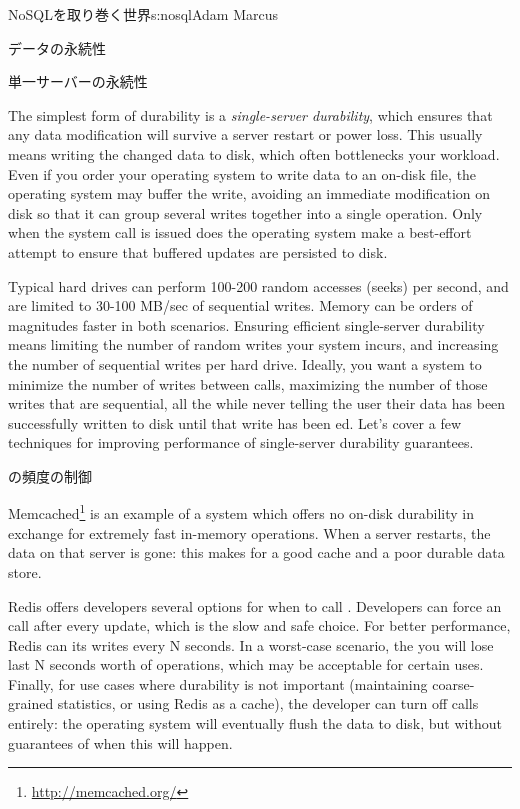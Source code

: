 \begin{aosachapter}{NoSQLを取り巻く世界}{s:nosql}{Adam Marcus}
\begin{aosasect1}{データの永続性}
\begin{aosasect2}{単一サーバーの永続性}

The simplest form of durability is a \emph{single-server durability},
which ensures that any data modification will survive a server restart
or power loss.  This usually means writing the changed data to disk,
which often bottlenecks your workload.  Even if you order your
operating system to write data to an on-disk file, the operating
system may buffer the write, avoiding an immediate modification on
disk so that it can group several writes together into a single
operation.  Only when the  system call is issued does the
operating system make a best-effort attempt to ensure that buffered
updates are persisted to disk.

Typical hard drives can perform 100-200 random accesses (seeks) per
second, and are limited to 30-100 MB/sec of sequential writes.  Memory can be orders of magnitudes faster in both scenarios.  Ensuring
efficient single-server durability means limiting the number of random
writes your system incurs, and increasing the number of sequential
writes per hard drive. Ideally, you want a system to minimize the
number of writes between  calls, maximizing the number of
those writes that are sequential, all the while never telling the user
their data has been successfully written to disk until that write has
been ed.  Let's cover a few techniques for improving
performance of single-server durability guarantees.

\begin{aosasect3}{の頻度の制御}

Memcached\footnote{\url{http://memcached.org/}} is an example of a system which offers no on-disk durability
in exchange for extremely fast in-memory operations.  When a server
restarts, the data on that server is gone: this makes for a good cache
and a poor durable data store.

Redis offers developers several options for when to call
. Developers can force an  call after every
update, which is the slow and safe choice.  For better performance,
Redis can  its writes every N seconds.  In a worst-case
scenario, the you will lose last N seconds worth of operations, which
may be acceptable for certain uses.  Finally, for use cases where
durability is not important (maintaining coarse-grained statistics, or
using Redis as a cache), the developer can turn off  calls
entirely: the operating system will eventually flush the data to disk,
but without guarantees of when this will happen.


\end{aosasect3}
\end{aosasect2}
\end{aosasect1}
\end{aosachapter}
